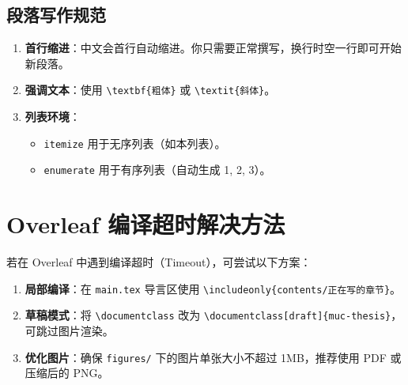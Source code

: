 \subsection{段落写作规范}
\begin{enumerate}
    \item \textbf{首行缩进}：中文会首行自动缩进。你只需要正常撰写，换行时空一行即可开始新段落。
    \item \textbf{强调文本}：使用 \texttt{\textbackslash textbf\{粗体\}} 或 \texttt{\textbackslash textit\{斜体\}}。
    \item \textbf{列表环境}：
        \begin{itemize}
            \item \texttt{itemize} 用于无序列表（如本列表）。
            \item \texttt{enumerate} 用于有序列表（自动生成 1, 2, 3）。
        \end{itemize}
\end{enumerate}

\section{Overleaf 编译超时解决方法}
若在 Overleaf 中遇到编译超时（Timeout），可尝试以下方案：
\begin{enumerate}
    \item \textbf{局部编译}：在 \texttt{main.tex} 导言区使用 \texttt{\textbackslash includeonly\{contents/正在写的章节\}}。
    \item \textbf{草稿模式}：将 \texttt{\textbackslash documentclass} 改为 \texttt{\textbackslash documentclass[draft]\{muc-thesis\}}，可跳过图片渲染。
    \item \textbf{优化图片}：确保 \texttt{figures/} 下的图片单张大小不超过 1MB，推荐使用 PDF 或压缩后的 PNG。
\end{enumerate}

